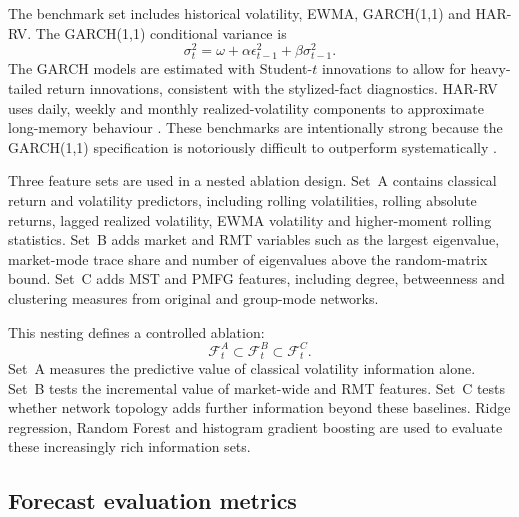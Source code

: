 The benchmark set includes historical volatility, EWMA, GARCH(1,1) and HAR-RV. The GARCH(1,1) conditional variance is
\begin{equation}
\sigma_t^2
=
\omega
+
\alpha \epsilon_{t-1}^{2}
+
\beta \sigma_{t-1}^{2}.
\end{equation}
The GARCH models are estimated with Student-$t$ innovations to allow for heavy-tailed return innovations, consistent with the stylized-fact diagnostics. HAR-RV uses daily, weekly and monthly realized-volatility components to approximate long-memory behaviour \cite{corsi_2009_simple}. These benchmarks are intentionally strong because the GARCH(1,1) specification is notoriously difficult to outperform systematically \cite{hansen_lunde_2005}.

Three feature sets are used in a nested ablation design. Set~A contains classical return and volatility predictors, including rolling volatilities, rolling absolute returns, lagged realized volatility, EWMA volatility and higher-moment rolling statistics. Set~B adds market and RMT variables such as the largest eigenvalue, market-mode trace share and number of eigenvalues above the random-matrix bound. Set~C adds MST and PMFG features, including degree, betweenness and clustering measures from original and group-mode networks.

This nesting defines a controlled ablation:
\begin{equation}
\mathcal{F}^{A}_{t}
\subset
\mathcal{F}^{B}_{t}
\subset
\mathcal{F}^{C}_{t}.
\end{equation}
Set~A measures the predictive value of classical volatility information alone. Set~B tests the incremental value of market-wide and RMT features. Set~C tests whether network topology adds further information beyond these baselines. Ridge regression, Random Forest and histogram gradient boosting are used to evaluate these increasingly rich information sets.

\subsection{Forecast evaluation metrics}
\label{subsec:evaluation_method}

